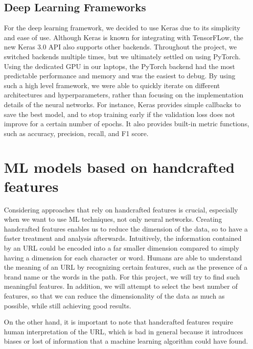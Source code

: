 \documentclass{article}
\begin{document}
    \subsection{Deep Learning Frameworks}
    For the deep learning framework, we decided to use Keras due to its simplicity and ease of use.
    Although Keras is known for integrating with TensorFLow, the new Keras 3.0 API also supports other backends.
    Throughout the project, we switched backends multiple times, but we ultimately settled on using PyTorch.
    Using the dedicated GPU in our laptops, the PyTorch backend had the most predictable performance and memory and was the easiest to debug.
    By using such a high level framework, we were able to quickly iterate on different architectures and hyperparameters, rather than focusing on the implementation details of the neural networks.
    For instance, Keras provides simple callbacks to save the best model, and to stop training early if the validation loss does not improve for a certain number of epochs.
    It also provides built-in metric functions, such as accuracy, precision, recall, and F1 score.


    \section{ML models based on handcrafted features}\label{sec:models-based-on-handcrafted-features}

    Considering approaches that rely on handcrafted features is crucial, especially when we want to use ML techniques, not only neural networks.
    Creating handcrafted features enables us to reduce the dimension of the data, so to have a faster treatment and analysis afterwards.
    Intuitively, the information contained by an URL could be encoded into a far smaller dimension compared to simply having a dimension for each character or word.
    Humans are able to understand the meaning of an URL by recognizing certain features, such as the presence of a brand name or the words in the path.
    For this project, we will try to find such meaningful features.
    In addition, we will attempt to select the best number of features, so that we can reduce the dimensionality of the data as much as possible, while still achieving good results.

    On the other hand, it is important to note that handcrafted features require human interpretation of the URL, which is bad in general because it introduces biases or lost of information that a machine learning algorithm could have found.
\end{document}
